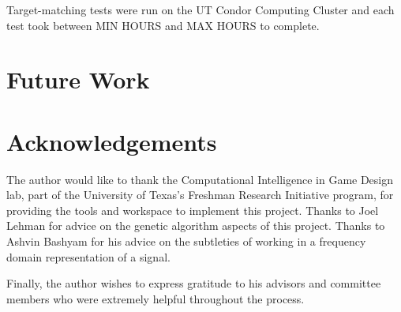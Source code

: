 \documentclass[12pt]{article}
\begin{document}
Target-matching tests were run on the UT Condor Computing Cluster and each test took between MIN HOURS and MAX HOURS to complete. \begin{comment}Interactive evolution tests were run on a variety of different machines. TODO: fill in with actual data \end{comment}

\section{Future Work}

\section{Acknowledgements}
The author would like to thank the Computational Intelligence in Game Design lab, part of the University of Texas's Freshman Research Initiative program, for providing the tools and workspace to implement this project. Thanks to Joel Lehman for advice on the genetic algorithm aspects of this project. Thanks to Ashvin Bashyam for his advice on the subtleties of working in a frequency domain representation of a signal. 
\begin{comment}
Thanks to TESTERS for kindly agreeing to test the interactive genetic algorithm.
\end{comment}
Finally, the author wishes to express gratitude to his advisors and committee members who were extremely helpful throughout the process.






\end{document}
